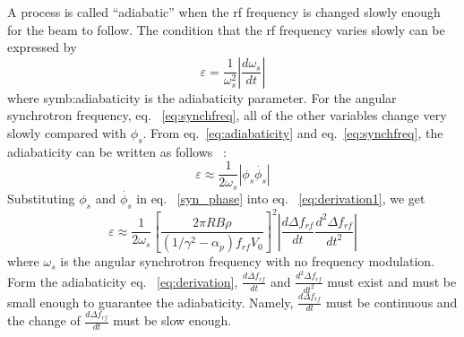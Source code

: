 \begin{itemize}
A process is called “adiabatic” when the rf frequency is changed slowly enough for the beam to follow. The condition that the rf frequency varies slowly can be expressed by 
\begin{equation}
\varepsilon=\frac{1}{\omega_s^2}|\frac{d\omega_s}{dt}|
\label{eq:adiabaticity}
\end{equation} 
where \gls{symb:adiabaticity} is the adiabaticity parameter. For the angular synchrotron frequency, eq. ~\ref{eq:synchfreq}, all of the other variables change very slowly compared with $\phi_s$. From eq.~\ref{eq:adiabaticity} and eq.~\ref{eq:synchfreq}, the adiabaticity can be written as follows ~\cite{ezura_beam-dynamics_2008}:
\begin{equation}
\varepsilon \approx \frac{1}{2\omega_s}|\phi_s\dot{\phi_{s}}|
\label{eq:derivation1}
\end{equation} 
Substituting $\phi_{s}$ and $\dot{\phi_{s}}$ in eq. ~\ref{syn_phase} into eq. ~\ref{eq:derivation1}, we get
\begin{equation}
\varepsilon \approx \frac{1}{2\omega_s}[\frac{2\pi R B\rho}{(1/\gamma^2-\alpha_p)f_\mathit{rf}V_0}]^2|\frac{d \Delta f_\mathit{rf}}{dt}\frac{d^2\Delta f_{\mathit{rf}}}{dt^2}|
\label{eq:derivation}
\end{equation} 
where $\omega_s$ is the angular synchrotron frequency with no frequency modulation. Form the adiabaticity eq. ~\ref{eq:derivation}, $\frac{d\Delta f_{\mathit{rf}}}{dt}$ and $\frac{d^2\Delta f_{\mathit{rf}}}{dt^2}$ must exist and must be small enough to guarantee the adiabaticity. Namely, $\frac{d\Delta f_{\mathit{rf}}}{dt}$ must be continuous and the change of $\frac{d\Delta f_{\mathit{rf}}}{dt}$ must be slow enough. 

%
%



\end{itemize}
